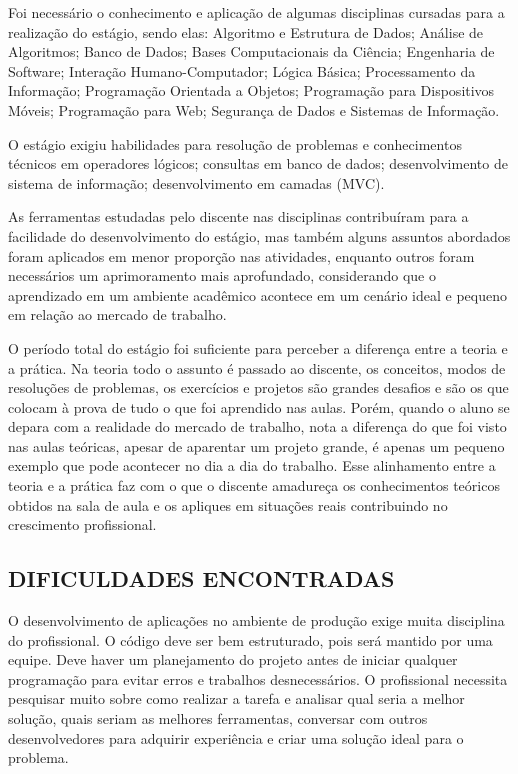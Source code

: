 \documentclass[
  12pt,				%
  openany,
  oneside,
  a4paper,			%
  english,			%
  brazil
]{article}
\numberwithin{figure}{section}
\numberwithin{table}{section}
\begin{document}
Foi necessário o conhecimento e aplicação de algumas disciplinas cursadas para a realização do estágio, sendo elas: Algoritmo e Estrutura de Dados; Análise de Algoritmos; Banco de Dados; Bases Computacionais da Ciência; Engenharia de Software; Interação Humano-Computador; Lógica Básica; Processamento da Informação; Programação Orientada a Objetos; Programação para Dispositivos Móveis; Programação para Web; Segurança de Dados e Sistemas de Informação.

O estágio exigiu habilidades para resolução de problemas e conhecimentos técnicos em operadores lógicos; consultas em banco de dados; desenvolvimento de sistema de informação; desenvolvimento em camadas (MVC).

As ferramentas estudadas pelo discente nas disciplinas contribuíram para a facilidade do desenvolvimento do estágio, mas também alguns assuntos abordados foram aplicados em menor proporção nas atividades, enquanto outros foram necessários um aprimoramento mais aprofundado, considerando que o aprendizado em um ambiente acadêmico acontece em um cenário ideal e pequeno em relação ao mercado de trabalho.

O período total do estágio foi suficiente para perceber a diferença entre a teoria e a prática. Na teoria todo o assunto é passado ao discente, os conceitos, modos de resoluções de problemas, os exercícios e projetos são grandes desafios e são os que colocam à prova de tudo o que foi aprendido nas aulas. Porém, quando o aluno se depara com a realidade do mercado de trabalho, nota a diferença do que foi visto nas aulas teóricas, apesar de aparentar um projeto grande, é apenas um pequeno exemplo que pode acontecer no dia a dia do trabalho. Esse alinhamento entre a teoria e a prática faz com o que o discente amadureça os conhecimentos teóricos obtidos na sala de aula e os apliques em situações reais contribuindo no crescimento profissional.



\subsection{DIFICULDADES ENCONTRADAS}

O desenvolvimento de aplicações no ambiente de produção exige muita disciplina do profissional. O código deve ser bem estruturado, pois será mantido por uma equipe. Deve haver um planejamento do projeto antes de iniciar qualquer programação para evitar erros e trabalhos desnecessários. O profissional necessita pesquisar muito sobre como realizar a tarefa e analisar qual seria a melhor solução, quais seriam as melhores ferramentas, conversar com outros desenvolvedores para adquirir experiência e criar uma solução ideal para o problema.
\end{document}
